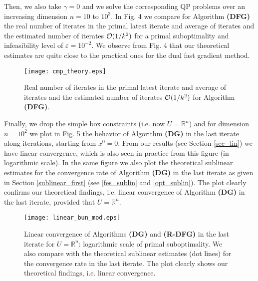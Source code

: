 \documentclass{gOMS2e}
\theoremstyle{plain}
\theoremstyle{definition}
\theoremstyle{remark}
\begin{document}
\noindent Then, we also take $\gamma=0$ and we solve the corresponding QP problems   over an
increasing dimension $n=10$ to $10^3$. In Fig. 4  we compare for Algorithm \textbf{(DFG)}  the real number of iterates in the primal latest iterate and average of iterates   and the estimated number of iterates ${\cal O}(1/k^2)$  for a primal suboptimality and infeasibility level of $\varepsilon=10^{-2}$. We observe from Fig. 4
that our theoretical estimates are quite close to the practical ones for the
dual fast gradient method.
\begin{figure}[ht]
\label{real_theory}
\caption{Real number of iterates  in the primal latest iterate and average of iterates
 and the estimated number of iterates ${\cal O}(1/k^2)$ for Algorithm \textbf{(DFG)}.}
\centerline{\texttt{[image: cmp\_theory.eps]}}
\end{figure}

\noindent Finally, we drop  the simple box constraints (i.e. now  $U =
{\mathbb{R}}^n$) and for dimension $n=10^2$ we  plot in Fig. 5
the behavior of Algorithm \textbf{(DG)} in the last iterate along
iterations, starting from $x^0=0$. From our results (see Section
\ref{sec_lin}) we have linear convergence, which is also seen in
practice from this figure (in logarithmic scale). In the same figure
we also  plot the  theoretical sublinear estimates for the
convergence rate of Algorithm \textbf{(DG)} in the last iterate as
given in Section \ref{sublinear_first} (see  \eqref{fes_sublin} and
\eqref{opt_sublin}). The plot clearly confirms our theoretical
findings, i.e. linear convergence of Algorithm \textbf{(DG)} in the
last iterate, provided that $U={\mathbb{R}}^n$.
\begin{figure}[ht]
\label{fig_lc} \caption{Linear convergence of Algorithms
\textbf{(DG)} and \textbf{(R-DFG)} in the last iterate for $U = {\mathbb{R}}^n$: logarithmic
scale of primal suboptimality. We also compare
with the  theoretical sublinear estimates (dot lines) for the
convergence rate in the last iterate. The plot clearly shows  our theoretical
findings, i.e. linear convergence. }
\centerline{\texttt{[image: linear\_bun\_mod.eps]}}
\end{figure}
\end{document}
